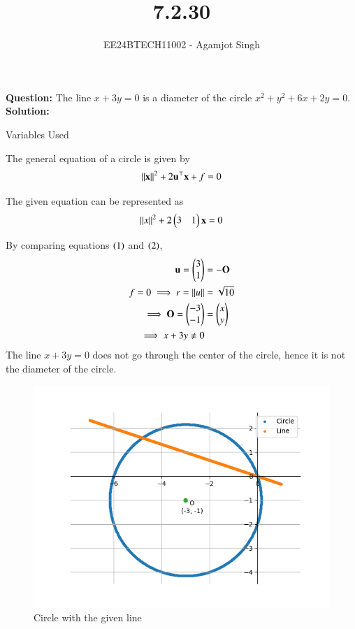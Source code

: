 \documentclass[journal]{IEEEtran}
\begin{document}

\vspace{3cm}

\title{7.2.30}
\author{EE24BTECH11002 - Agamjot Singh}
{\let\newpage\relax\maketitle}

\renewcommand{\thefigure}{\theenumi}
\renewcommand{\thetable}{\theenumi}
\setlength{\intextsep}{10pt} %

\textbf{Question:}
\newline
The line $x + 3y = 0$ is a diameter of the circle $x^2 + y^2 + 6x + 2y = 0$.
\newline
\textbf{Solution:}
\newline

\begin{table}[h!]
	\centering
	
	\caption{Variables Used}
	\label{tab4-4.3.2}
\end{table}

The general equation of a circle is given by 
\begin{align}
	\left\lVert\mathbf{x}\right\rVert^2 + 2\mathbf{u}^\top\mathbf{x} + f = 0
\end{align}

The given equation can be represented as
\begin{align}
	\left\lVert x\right\rVert^2 + 2\begin{pmatrix}3 & 1\end{pmatrix}\mathbf{x} = 0
\end{align}

By comparing equations $\left(1\right)$ and $\left(2\right)$,
\begin{align}
	\mathbf{u} = \begin{pmatrix}3\\1\end{pmatrix} &= -\mathbf{O}\\
	f = 0 \implies r = \left\lVert u\right\rVert &= \sqrt{10}\\
	\implies \mathbf{O} = \begin{pmatrix}-3\\-1\end{pmatrix} &= \begin{pmatrix}x\\y\end{pmatrix}\\
	\implies x + 3y \neq 0 
\end{align}
The line $x + 3y = 0$ does not go through the center of the circle, hence it is not the diameter of the circle.

\begin{figure}[h!]
   \centering
   \includegraphics[width=0.7\linewidth]{figs/graph.png}
   \caption{Circle with the given line}
\end{figure}
\end{document}

